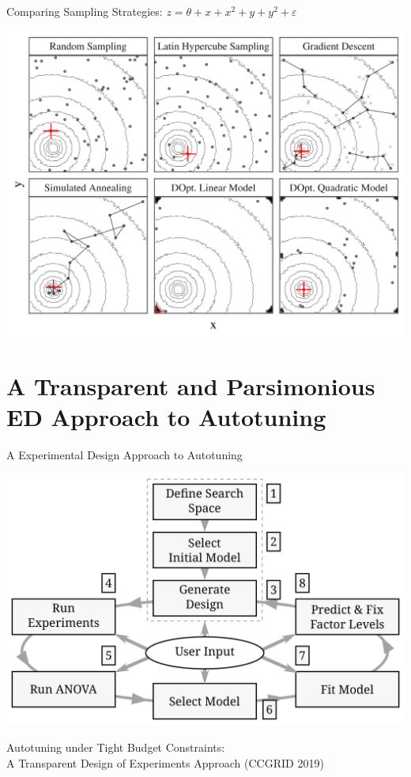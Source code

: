 \documentclass[10pt, compress, aspectratio=169, xcolor={table,usenames,dvipsnames}]{beamer}
\begin{document}
\begin{frame}[label={sec:org63e16d9}]{Comparing Sampling Strategies: \(z = \theta + x + x^2 + y + y^2 + \varepsilon\)}
\begin{center}
\begin{center}
\includegraphics[width=.72\textwidth]{../../../img/sampling_comparison.pdf}
\end{center}
\end{center}
\end{frame}
\section{A Transparent and Parsimonious ED Approach to Autotuning}
\label{sec:org1e115fb}
\begin{frame}[label={sec:orgd40fd99}]{A Experimental Design Approach to Autotuning}
\begin{center}
\begin{center}
\includegraphics[width=.74\linewidth]{../../../img/doe_anova_strategy.pdf}
\end{center}

\vspace{-.2cm}
\end{center}

\begin{center}
\scriptsize{Autotuning under Tight Budget Constraints: \\ A Transparent Design of Experiments Approach (CCGRID 2019)}
\end{center}
\end{frame}
\end{document}
